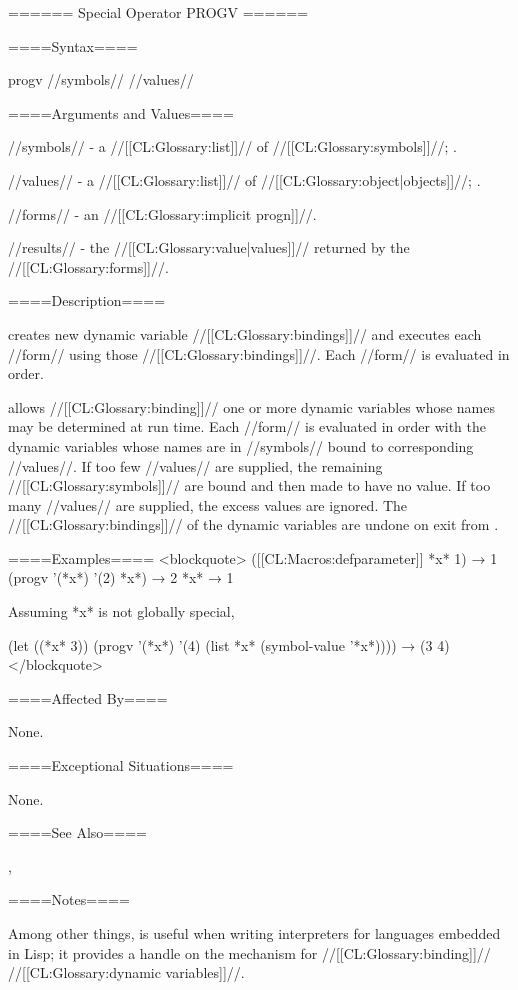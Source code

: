 ====== Special Operator PROGV ======

====Syntax====

\DefspecWithValues progv {//symbols// //values// } {}

====Arguments and Values====

//symbols// - a //[[CL:Glossary:list]]// of //[[CL:Glossary:symbols]]//; \eval.

//values// - a //[[CL:Glossary:list]]// of //[[CL:Glossary:object|objects]]//; \eval.

//forms// - an //[[CL:Glossary:implicit progn]]//.

//results// - the //[[CL:Glossary:value|values]]// returned by the //[[CL:Glossary:forms]]//.

====Description====

 creates new dynamic variable //[[CL:Glossary:bindings]]// and executes each //form// using those //[[CL:Glossary:bindings]]//. Each //form// is evaluated in order.

 allows //[[CL:Glossary:binding]]// one or more dynamic variables whose names may be determined at run time. Each //form// is evaluated in order with the dynamic variables whose names are in //symbols// bound to corresponding //values//. If too few //values// are supplied, the remaining //[[CL:Glossary:symbols]]// are bound and then made to have no value. If too many //values// are supplied, the excess values are ignored. The //[[CL:Glossary:bindings]]// of the dynamic variables are undone on exit from .

====Examples==== <blockquote> ([[CL:Macros:defparameter]] *x* 1) → 1 (progv '(*x*) '(2) *x*) → 2 *x* → 1

Assuming *x* is not globally special,

(let ((*x* 3)) (progv '(*x*) '(4) (list *x* (symbol-value '*x*)))) → (3 4) </blockquote>

====Affected By====

None.

====Exceptional Situations====

None.

====See Also====

, {\secref\Evaluation}

====Notes====

Among other things,  is useful when writing interpreters for languages embedded in Lisp; it provides a handle on the mechanism for //[[CL:Glossary:binding]]// //[[CL:Glossary:dynamic variables]]//.

